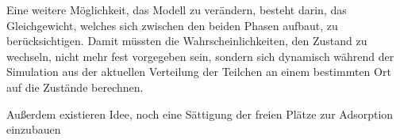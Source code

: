 % 
% 
%         
% 
%         
% 
% 
%  
%   
% 
% 
% 
%         
%         

Eine weitere Möglichkeit, das Modell zu verändern, besteht darin, das Gleichgewicht, welches sich zwischen den beiden Phasen aufbaut, zu berücksichtigen. Damit müssten die Wahrscheinlichkeiten, den Zustand zu wechseln, nicht mehr fest vorgegeben sein, sondern sich dynamisch während der Simulation aus der aktuellen Verteilung der Teilchen an einem bestimmten Ort auf die Zustände berechnen.

Außerdem existieren Idee, noch eine Sättigung der freien Plätze zur Adsorption einzubauen


